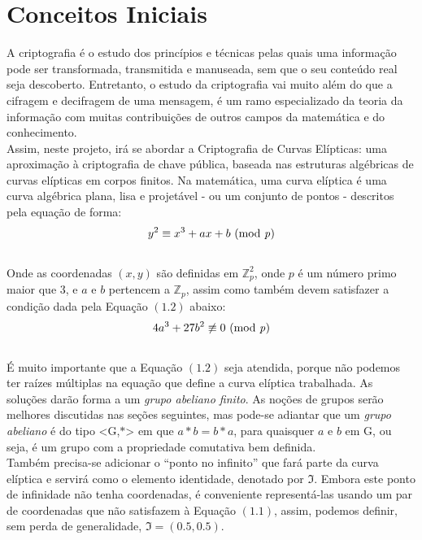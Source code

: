 \documentclass[14pt, oneside]{book}
\newcommand\tab[1][1cm]{\hspace*{#1}}
\theoremstyle{definition}
\begin{document}
            \section{Conceitos Iniciais}
                \tab A criptografia é o estudo dos princípios e técnicas pelas quais uma informação pode ser transformada, transmitida e manuseada, sem que o seu conteúdo real seja descoberto. Entretanto, o estudo da criptografia vai muito além do que a cifragem e decifragem de uma mensagem, é um ramo especializado da teoria da informação com muitas contribuições de outros campos da matemática e do conhecimento. \\
                \tab Assim, neste projeto, irá se abordar a Criptografia de Curvas Elípticas: uma aproximação à criptografia de chave pública, baseada nas estruturas algébricas de curvas elípticas em corpos finitos. Na matemática, uma curva elíptica é uma curva algébrica plana, lisa e projetável - ou um conjunto de pontos - descritos pela equação de forma: \\
                \begin{equation}
                    y^2 \equiv x^3 +ax +b \textrm{\ (mod \textit{p})}
                \end{equation}
                \\
                \tab Onde as coordenadas $(x, y)$ são definidas em $\mathbb{Z}_p^2$, onde $p$ é um número primo maior que $3$, e $a$ e $b$ pertencem a $\mathbb{Z}_p$, assim como também devem satisfazer a condição dada pela Equação $(1.2)$ abaixo: \\
                \begin{equation}
                    4a^3 +27b^2 \not\equiv 0 \textrm{\ (mod \textit{p})}
                \end{equation}
                \\
                \tab É muito importante que a Equação $(1.2)$ seja atendida, porque não podemos ter raízes múltiplas na equação que define a curva elíptica trabalhada.
                As soluções darão forma a um \textit{grupo abeliano finito}. As noções de grupos serão melhores discutidas nas seções seguintes, mas pode-se adiantar que um \textit{grupo abeliano} é do tipo <G,$\ast$> em que $a\ast b = b\ast a$, para quaisquer $a$ e $b$ em G, ou seja, é um grupo com a propriedade comutativa bem definida. \\
                \tab Também precisa-se adicionar o “ponto no infinito” que fará parte da curva elíptica e servirá como o elemento identidade, denotado por ${\Im}$. Embora este ponto de infinidade não tenha coordenadas, é conveniente representá-las usando um par de coordenadas que não satisfazem à Equação $(1.1)$, assim, podemos definir, sem perda de generalidade, ${\Im} = (0.5,0.5).$\\
\end{document}
